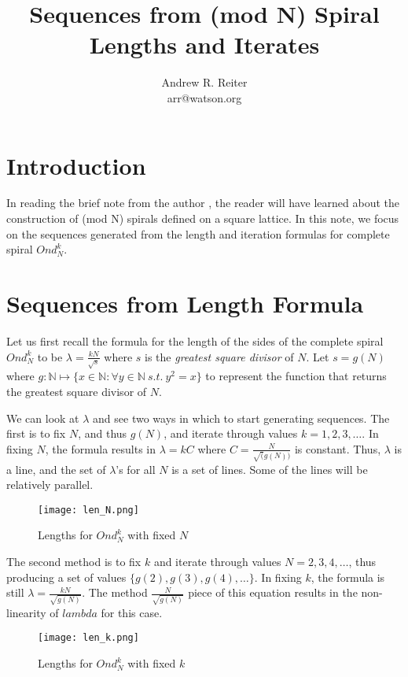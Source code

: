 \documentclass[11pt]{amsart}
\title{Sequences from (mod N) Spiral Lengths and Iterates}
\author{Andrew R. Reiter\\arr@watson.org}
\begin{document}
\maketitle

\section{Introduction}
In reading the brief note from the author \cite{ARRmodN}, the reader will have learned about the construction of (mod N) spirals defined on a square lattice. In this note, we focus on the sequences generated from the length and iteration formulas for complete spiral $Ond^k_N$.

\section{Sequences from Length Formula}
Let us first recall the formula for the length of the sides of the complete spiral $Ond^k_N$ to be $\lambda = \frac{kN}{\sqrt{s}}$ where $s$ is the \textit{greatest square divisor} of $N$. Let $s = g(N)$ where $g : \mathbb{N} \mapsto \{ x \in \mathbb{N} : \forall y \in \mathbb{N}\ s.t.\ y^2 = x \}$ to represent the function that returns the greatest square divisor of $N$.

We can look at $\lambda$ and see two ways in which to start generating sequences. The first is to fix $N$, and thus $g(N)$, and iterate through values $k=1, 2, 3, \ldots$. In fixing $N$, the formula results in $\lambda = kC$ where $C = \frac{N}{\sqrt(g(N))}$ is constant. Thus, $\lambda$ is a line, and the set of $\lambda$'s for all $N$ is a set of lines. Some of the lines will be relatively parallel. 

\begin{figure}[H]
\centering
\texttt{[image: len\_N.png]}
\caption{Lengths for $Ond^k_N$ with fixed $N$}
\label{fig:len_N}
\end{figure}

The second method is to fix $k$ and iterate through values $N=2, 3, 4, \ldots$, thus producing a set of values $\{ g(2), g(3), g(4), \ldots \}$. In fixing $k$, the formula is still $\lambda = \frac{kN}{\sqrt{g(N)}}$. The method $\frac{N}{\sqrt{g(N)}}$ piece of this equation results in the non-linearity of $lambda$ for this case. 

\begin{figure}[H]
\centering
\texttt{[image: len\_k.png]}
\caption{Lengths for $Ond^k_N$ with fixed $k$}
\label{fig:len_k}
\end{figure}
\end{document}
